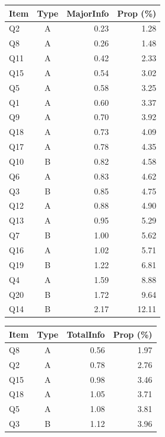 \documentclass[a4paper]{report}
\begin{document}
\begin{table}[H]
  \begin{minipage}{0.5\linewidth}
      \centering
      \begin{tabular}{lcrr}
        \hline
      Item & Type & MajorInfo & Prop (\%) \\ 
        \hline
      Q2 & A & 0.23 & 1.28 \\ 
        Q8 & A & 0.26 & 1.48 \\ 
        Q11 & A & 0.42 & 2.33 \\ 
        Q15 & A & 0.54 & 3.02 \\ 
        Q5 & A & 0.58 & 3.25 \\ 
        Q1 & A & 0.60 & 3.37 \\ 
        Q9 & A & 0.70 & 3.92 \\ 
        Q18 & A & 0.73 & 4.09 \\ 
        Q17 & A & 0.78 & 4.35 \\ 
        Q10 & B & 0.82 & 4.58 \\ 
        Q6 & A & 0.83 & 4.62 \\ 
        Q3 & B & 0.85 & 4.75 \\ 
        Q12 & A & 0.88 & 4.90 \\ 
        Q13 & A & 0.95 & 5.29 \\ 
        Q7 & B & 1.00 & 5.62 \\ 
        Q16 & A & 1.02 & 5.71 \\ 
        Q19 & B & 1.22 & 6.81 \\ 
        Q4 & A & 1.59 & 8.88 \\ 
        Q20 & B & 1.72 & 9.64 \\ 
        Q14 & B & 2.17 & 12.11 \\ 
         \hline
      \end{tabular}
  \end{minipage}%
  \begin{minipage}{0.5\linewidth}
    \centering
    \begin{tabular}{lcrr}
      \hline
    Item & Type & TotalInfo & Prop (\%) \\ 
      \hline
    Q8 & A & 0.56 & 1.97 \\ 
      Q2 & A & 0.78 & 2.76 \\ 
      Q15 & A & 0.98 & 3.46 \\ 
      Q18 & A & 1.05 & 3.71 \\ 
      Q5 & A & 1.08 & 3.81 \\ 
      Q3 & B & 1.12 & 3.96 \\ 

\end{tabular}
\end{minipage}
\end{table}
\end{document}
